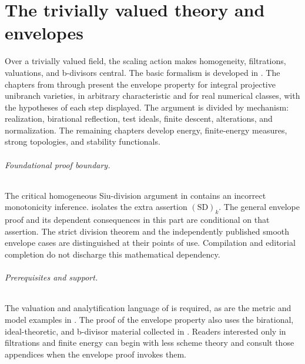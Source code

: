 \part{The trivially valued theory and envelopes}
\label{part:bj}

Over a trivially valued field, the scaling action makes homogeneity,
filtrations, valuations, and b-divisors central.  The basic formalism is
developed in
.
The chapters from  through
 present the envelope property for
integral projective unibranch varieties, in arbitrary characteristic and for
real numerical classes, with the hypotheses of each step displayed.  The
argument is divided by mechanism: realization, birational reflection, test
ideals, finite descent, alterations, and normalization.  The remaining
chapters develop energy, finite-energy measures, strong topologies, and
stability functionals.

\paragraph{Foundational proof boundary.}
The critical homogeneous Siu-division argument in
\cite[Theorem~6.21]{BJ22} contains an incorrect monotonicity inference.
 isolates the extra assertion
$\mathrm{(SD)}_k$. The general envelope proof and its dependent
consequences in this part are conditional on that assertion. The strict
division theorem and the independently published smooth envelope cases
are distinguished at their points of use. Compilation and editorial
completion do not discharge this mathematical dependency.

\paragraph{Prerequisites and support.}
\label{front:part4-prerequisites-and-support}
The valuation and analytification language of
 is required, as are the metric and model
examples in .  The proof of the
envelope property also uses the birational, ideal-theoretic, and b-divisor
material collected in
.
Readers interested only in filtrations and finite energy can begin with less
scheme theory and consult those appendices when the envelope proof invokes
them.

